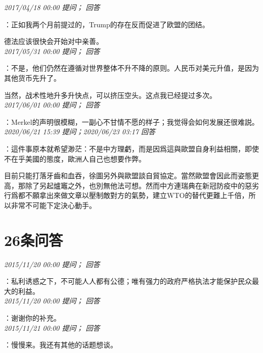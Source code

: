 \documentclass[twocolumn]{ctexart}
\begin{document}
\textit{\hfill\noindent\small 2017/04/18 00:00 提问； 回答}

：正如我两个月前提过的，Trump的存在反而促进了欧盟的团结。

德法应该很快会开始对中亲善。\\

\textit{\hfill\noindent\small 2017/05/31 00:00 提问； 回答}

：不是，他们仍然在遵循对世界整体不升不降的原则。人民币对美元升值，是因为其他货币先升了。

当然，战术性地升多升快点，可以挤压空头。这点我已经提过多次。\\

\textit{\hfill\noindent\small 2017/06/01 00:00 提问； 回答}

：Merkel的声明很模糊，一副心不甘情不愿的样子；我觉得会如何发展还很难説。\\

\textit{\hfill\noindent\small 2020/06/21 15:39 提问；2020/06/23 03:17 回答}

：這件事原本就希望渺茫：不是中方理虧，而是因爲這與歐盟自身利益相關，即使不在乎美國的態度，歐洲人自己也想要作弊。

目前只能打落牙齒和血吞，徐圖另外與歐盟談自貿協定。當然歐盟會因此而姿態更高，那除了另起爐竈之外，也別無他法可想。然而中方連瑞典在新冠防疫中的惡劣行爲都不願拿出來做文章以壓制敵對方的氣勢，建立WTO的替代更難上千倍，所以非常不可能下定決心動手。
\\

\section{26条问答}

\textit{\hfill\noindent\small 2015/11/20 00:00 提问； 回答}

：私利诱惑之下，不可能人人都有公德；唯有强力的政府严格执法才能保护民众最大的利益。\\

\textit{\hfill\noindent\small 2015/11/20 00:00 提问； 回答}

：谢谢你的补充。\\

\textit{\hfill\noindent\small 2015/11/21 00:00 提问； 回答}

：慢慢来。我还有其他的话题想谈。\\
\end{document}
